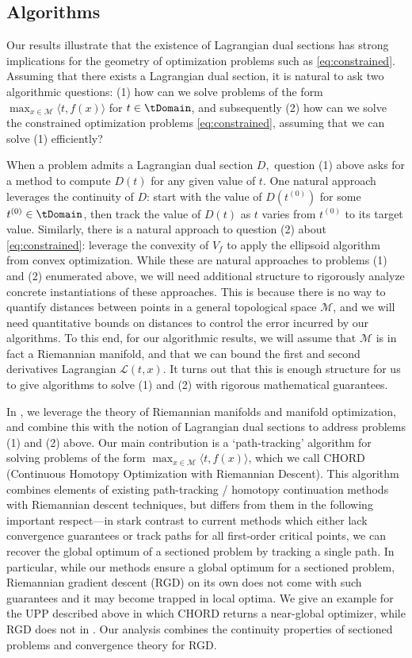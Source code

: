 \documentclass{article}
\numberwithin{equation}{section}
\newcommand{\cL}{\mathcal{L}}
\newcommand{\cM}{{\mathcal{M}}}
\begin{document}
\subsection{Algorithms}
\label{subsec:algorithms}
Our results illustrate that the existence of Lagrangian dual sections has strong implications for the geometry of optimization problems such as \eqref{eq:constrained}. Assuming that there exists a Lagrangian dual section, it is natural to ask two algorithmic questions: (1) how can we solve problems of the form $\max_{x \in \cM} \langle t, f(x)\rangle$ for $t \in \tDomain$, and subsequently (2) how can we solve the constrained optimization problems \eqref{eq:constrained}, assuming that we can solve (1) efficiently?

When a problem admits a Lagrangian dual section $D,$ question (1) above asks for a method to compute $D(t)$ for any given value of $t$. One natural approach leverages the continuity of $D$: start with the value of $D(t^{(0)})$ for some $t^{(0)} \in \tDomain$, then track the value of $D(t)$ as $t$ varies from $t^{(0)}$ to its target value. Similarly, there is a natural approach to question (2) about \eqref{eq:constrained}: leverage the convexity of $V_f$ to apply the ellipsoid algorithm from convex optimization.
While these are natural approaches to problems (1) and (2) enumerated above, we will need additional structure to rigorously analyze concrete instantiations of these approaches. This is because there is no way to quantify distances between points in a general topological space $\cM$, and we will need quantitative bounds on distances to control the error incurred by our algorithms. To this end, for our algorithmic results, we will assume that $\cM$ is in fact a Riemannian manifold, and that we can bound the first and second derivatives Lagrangian $\cL(t,x)$. It turns out that this is enough structure for us to give algorithms to solve (1) and (2) with rigorous mathematical guarantees.

In , we leverage the theory of Riemannian manifolds and manifold optimization, and combine this with the notion of Lagrangian dual sections to address problems (1) and (2) above. Our main contribution is a `path-tracking' algorithm for solving problems of the form $\max_{x \in \cM} \langle t, f(x)\rangle$, which we call CHORD (Continuous Homotopy Optimization with Riemannian Descent).
This algorithm combines elements of existing path-tracking / homotopy continuation methods with Riemannian descent techniques, but differs from them in the following important respect---in stark contrast to current methods which either lack convergence guarantees or track paths for all first-order critical points, we can recover the global optimum of a sectioned problem by tracking a single path.  In particular, while our methods ensure a global optimum for a sectioned problem, Riemannian gradient descent (RGD) on its own does not come with such guarantees and it may become trapped in local optima.  We give an example for the UPP described above in which CHORD returns a near-global optimizer, while RGD does not in .  Our analysis combines the continuity properties of sectioned problems and convergence theory for RGD.  
\end{document}
